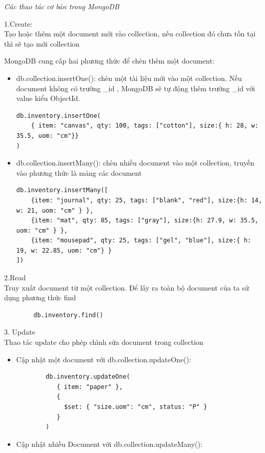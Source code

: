 \textit{Các thao tác cơ bản trong MongoDB}
\begin{description}
\item 1.Create:\\
Tạo hoặc thêm một document mới vào collection, nếu collection đó chưa tồn tại thì sẽ tạo mới collection

MongoDB cung cấp hai phương thức để chèn thêm một document:
\begin{itemize}
    \item db.collection.insertOne(): chèn một tài liệu mới vào một collection. Nếu document không có trường \_id , MongoDB sẽ tự động thêm trường \_id với value kiểu ObjectId.
\begin{verbatim}
db.inventory.insertOne(
    { item: "canvas", qty: 100, tags: ["cotton"], size:{ h: 28, w: 35.5, uom: "cm"}}
)
\end{verbatim}
    \item db.collection.insertMany(): chèn nhiều document vào một collection, truyền vào phương thức là mảng các document
\begin{verbatim}
db.inventory.insertMany([
    {item: "journal", qty: 25, tags: ["blank", "red"], size:{h: 14, w: 21, uom: "cm" } },
    {item: "mat", qty: 85, tags: ["gray"], size:{h: 27.9, w: 35.5, uom: "cm" } },
    {item: "mousepad", qty: 25, tags: ["gel", "blue"], size:{ h: 19, w: 22.85, uom: "cm"} }
])
\end{verbatim}
\end{itemize}
\item 2.Read\\
Truy xuất document từ một collection. Để lấy ra toàn bộ document của ta sử dụng phương thức find
\begin{verbatim}
        db.inventory.find()
\end{verbatim}
\item 3. Update\\
Thao tác update cho phép chình sửa document trong collection
\begin{itemize}
    \item Cập nhật một document với db.collection.updateOne():
    \begin{verbatim}
        db.inventory.updateOne(
           { item: "paper" },
           {
             $set: { "size.uom": "cm", status: "P" }
           }
        )
    \end{verbatim}
    \item Cập nhật nhiều Document với db.collection.updateMany():
    \begin{verbatim}

\end{verbatim}
\end{itemize}
\end{description}
